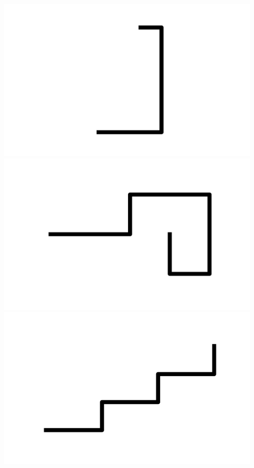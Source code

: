 \documentclass[]{report}
\begin{document}
\includegraphics[scale=.1]{pictures/21/state_cluster_shapes_286.pdf} 
\includegraphics[scale=.1]{pictures/21/state_cluster_shapes_287.pdf} 
\includegraphics[scale=.1]{pictures/21/state_cluster_shapes_288.pdf} 
\end{document}
